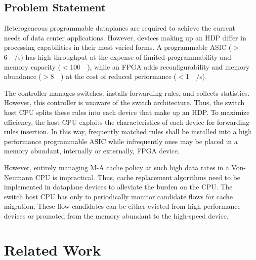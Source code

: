\subsection{Problem Statement}\label{problem}

Heterogeneous programmable dataplanes are required to achieve the current needs of data center applications. However, devices making up an HDP differ in processing capabilities in their most varied forms. A programmable ASIC ($>$\SI{6}{\tera\bit/\second}) has high throughput at the expense of limited programmability and memory capacity ($<$\SI{100}{\mega\bit}), while an FPGA adds reconfigurability and memory abundance ($>$\SI{8}{\giga\byte}) at the cost of reduced performance ($<$\SI{1}{\tera\bit/\second}).

The controller manages switches, installs forwarding rules, and collects statistics. However, this controller is unaware of the switch architecture. Thus, the switch host CPU splits these rules into each device that make up an HDP. To maximize efficiency, the host CPU exploits the characteristics of each device for forwarding rules insertion. In this way, frequently matched rules shall be installed into a high performance programmable ASIC while infrequently ones may be placed in a memory abundant, internally or externally, FPGA device. 

However, entirely managing M-A cache policy at such high data rates in a Von-Neumann CPU is impractical. Thus, cache replacement algorithms need to be implemented in dataplane devices to alleviate the burden on the CPU. The switch host CPU has only to periodically monitor candidate flows for cache migration. These flow candidates can be either evicted from high performance devices or promoted from the memory abundant to the high-speed device.

\section{Related Work}\label{sec:related_works}

%
%
%
%
%
%
%
%


